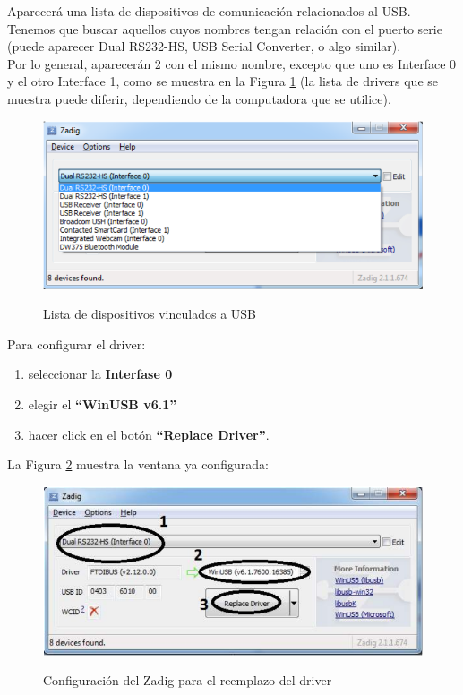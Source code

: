 \documentclass[12pt,letterpaper]{article}
\begin{document}
Aparecerá una lista de dispositivos de comunicación relacionados al USB. Tenemos que buscar aquellos cuyos nombres tengan relación con el puerto serie (puede aparecer Dual RS232-HS, USB Serial Converter, o algo similar).\\

Por lo general, aparecerán 2 con el mismo nombre, excepto que uno es Interface 0 y el otro Interface 1, como se muestra en la Figura \ref{Fig16} (la lista de drivers que se muestra puede diferir, dependiendo de la computadora que se utilice).

\begin{center}
\begin{figure}[!h]
\centering
\includegraphics[width=8 cm]{figuras/instalacion14.png}\\
\caption{Lista de dispositivos vinculados a USB}
\label{Fig16}
\end{figure}
\end{center}

Para configurar el driver:

\begin{enumerate}
\item[1]seleccionar la \textbf{Interfase 0}
\item[2]elegir el \textbf{“WinUSB v6.1”}
\item[2]hacer click en el botón \textbf{“Replace Driver”}.
\end{enumerate}

La Figura \ref{Fig17} muestra la ventana ya configurada:

\begin{center}
\begin{figure}[!h]
\centering
\includegraphics[width=8 cm]{figuras/instalacion15.png}\\
\caption{Configuración del Zadig para el reemplazo del driver}
\label{Fig17}
\end{figure}
\end{center}
\end{document}

